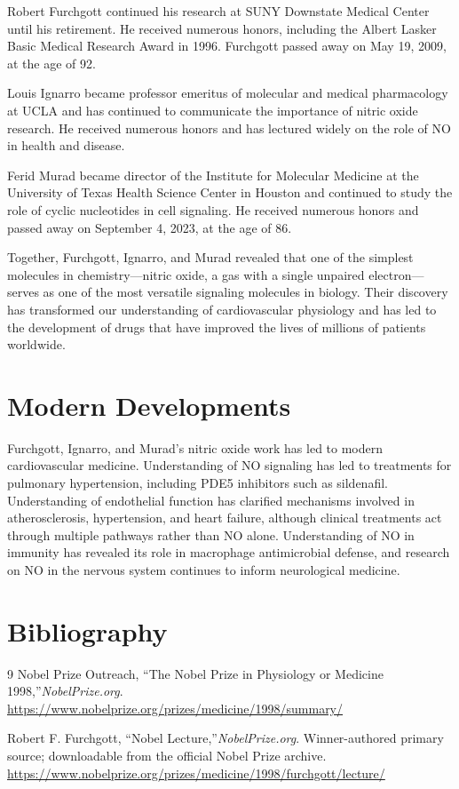 Robert Furchgott continued his research at SUNY Downstate Medical Center until his retirement. He received numerous honors, including the Albert Lasker Basic Medical Research Award in 1996. Furchgott passed away on May 19, 2009, at the age of 92.

Louis Ignarro became professor emeritus of molecular and medical pharmacology at UCLA and has continued to communicate the importance of nitric oxide research. He received numerous honors and has lectured widely on the role of NO in health and disease.

Ferid Murad became director of the Institute for Molecular Medicine at the University of Texas Health Science Center in Houston and continued to study the role of cyclic nucleotides in cell signaling. He received numerous honors and passed away on September 4, 2023, at the age of 86.

Together, Furchgott, Ignarro, and Murad revealed that one of the simplest molecules in chemistry---nitric oxide, a gas with a single unpaired electron---serves as one of the most versatile signaling molecules in biology. Their discovery has transformed our understanding of cardiovascular physiology and has led to the development of drugs that have improved the lives of millions of patients worldwide.


\section{Modern Developments}

Furchgott, Ignarro, and Murad's nitric oxide work has led to modern cardiovascular medicine. Understanding of NO signaling has led to treatments for pulmonary hypertension, including PDE5 inhibitors such as sildenafil. Understanding of endothelial function has clarified mechanisms involved in atherosclerosis, hypertension, and heart failure, although clinical treatments act through multiple pathways rather than NO alone. Understanding of NO in immunity has revealed its role in macrophage antimicrobial defense, and research on NO in the nervous system continues to inform neurological medicine.


\section{Bibliography}

\begin{thebibliography}{9}
Nobel Prize Outreach, ``The Nobel Prize in Physiology or Medicine 1998,''\emph{NobelPrize.org}.\\
\url{https://www.nobelprize.org/prizes/medicine/1998/summary/}

Robert F. Furchgott, ``Nobel Lecture,''\emph{NobelPrize.org}. Winner-authored primary source; downloadable from the official Nobel Prize archive.\\
\url{https://www.nobelprize.org/prizes/medicine/1998/furchgott/lecture/}
\end{thebibliography}
